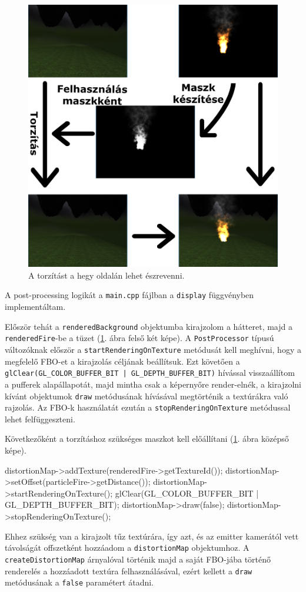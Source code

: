 \begin{figure}[h]
 \centering
 \includegraphics[width=\textwidth]{kepek/postprocessing.png}
 \caption{A torzítást a hegy oldalán lehet észrevenni.}
 \label{fig:postprocessing}
\end{figure}

A post-processing logikát a \texttt{main.cpp} fájlban a \texttt{display} függvényben implementáltam.

Először tehát a \texttt{renderedBackground} objektumba kirajzolom a hátteret, majd a \texttt{renderedFire}-be a tüzet (\ref{fig:postprocessing}. ábra felső két képe). A \texttt{PostProcessor} típusú változóknak először a \texttt{startRenderingOnTexture} metódusát kell meghívni, hogy a megfelelő FBO-et a kirajzolás céljának beállítsuk. Ezt követően a \texttt{glClear(GL\_COLOR\_BUFFER\_BIT | GL\_DEPTH\_BUFFER\_BIT)} hívással visszaállítom a pufferek alapállapotát, majd mintha csak a képernyőre render-elnék, a kirajzolni kívánt objektumok \texttt{draw} metódusának hívásával megtörténik a textúrákra való rajzolás. Az FBO-k használatát ezután a \texttt{stopRenderingOnTexture} metódussal lehet felfüggeszteni.

Következőként a torzításhoz szükséges maszkot kell előállítani (\ref{fig:postprocessing}. ábra középső képe). 
\begin{cpp}
distortionMap->addTexture(renderedFire->getTextureId());
distortionMap->setOffset(particleFire->getDistance());
distortionMap->startRenderingOnTexture();
glClear(GL_COLOR_BUFFER_BIT | GL_DEPTH_BUFFER_BIT);
distortionMap->draw(false);
distortionMap->stopRenderingOnTexture();
\end{cpp}
Ehhez szükség van a kirajzolt tűz textúrára, így azt, és az emitter kamerától vett távolságát offszetként hozzáadom a \texttt{distortionMap} objektumhoz. A \texttt{createDistortionMap} árnyalóval történik majd a saját FBO-jába történő renderelés a hozzáadott textúra felhasználásával, ezért kellett a \texttt{draw} metódusának a \texttt{false} paramétert átadni. 

